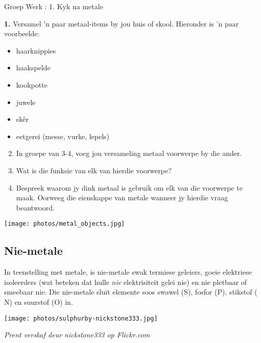             \begin{activity}{Groep Werk : 1. Kyk na metale}{
            \nopagebreak
\textbf{1.} Versamel 'n paar metaal-items by jou huis of skool. Hieronder is  'n paar voorbeelde:
\label{m38708*id65885}\begin{itemize}[noitemsep]
            \label{m38708*uid84}\item haarknippies
\label{m38708*uid85}\item haakspelde
\label{m38708*uid86}\item kookpotte
\label{m38708*uid87}\item juwele
\label{m38708*uid88}\item sk\^er
\label{m38708*uid89}\item eetgerei (messe, vurke, lepels)
\end{itemize}
\begin{minipage}{0.5\textwidth}
        \label{m38708*id65869}\begin{enumerate}[noitemsep, label=\textbf{\arabic*}. ]
\setcounter{enumi}{1}
        \label{m38708*uid90}\item In groepe van 3-4, voeg jou versameling metaal voorwerpe by die ander.
\label{m38708*uid91}\item Wat is die funksie van elk van hierdie voorwerpe?
\label{m38708*uid92}\item Bespreek waarom jy dink metaal is gebruik om elk van die voorwerpe te maak. Oorweeg die eienskappe van metale wanneer jy hierdie vraag beantwoord. 
\end{enumerate}
\end{minipage}
\begin{minipage}{.5\textwidth}
\begin{center}
 \texttt{[image: photos/metal\_objects.jpg]}\par
\end{center}
\end{minipage}
}
\end{activity}
      \label{m38708*uid93}
            \subsection*{Nie-metale}
            \nopagebreak
\begin{minipage}{.5\textwidth}
        \label{m38708*id66021}In teenstelling met metale, is nie-metale swak termiese geleiers, goeie elektriese isoleerders (wat beteken dat hulle \textsl{nie} elektrisiteit gelei nie) en nie pletbaar of smeebaar nie. Die nie-metale sluit elemente soos swawel ($\text{S}$), fosfor ($\text{P}$), stikstof ($\text{N}$) en suurstof ($\text{O}$) in.\par 
\end{minipage}
\begin{minipage}{.5\textwidth}
\begin{center}
 \texttt{[image: photos/sulphurby-nickstone333.jpg]}\par
\textit{Prent verskaf deur nickstone333 op Flickr.com}
\end{center}
\end{minipage}
      \label{m38708*uid94}
